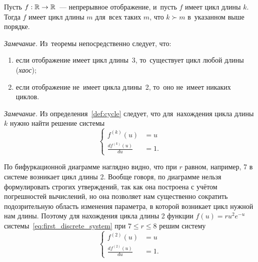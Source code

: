 \begin{theorem}[Шарковского]
        Пусть $f:\mathbb{R}\rightarrow\mathbb{R}$~--- непрерывное отображение, и~пусть $f$ имеет цикл длины $k$. Тогда $f$ имеет цикл длины $m$ для~всех таких $m$, что $k \succ m$ в~указанном выше порядке. \cite[стр.~89]{bratus10}
\end{theorem}
\textit{Замечание.} Из~теоремы непосредственно следует, что:
\begin{enumerate}
        \item если отображение имеет цикл длины~3, то~существует цикл любой длины (\textit{хаос});
        \item если отображение не~имеет цикла длины~2, то~оно не~имеет никаких циклов.
\end{enumerate}
\textit{Замечание.} Из определения~\ref{def:cycle} следует, что для~нахождения цикла длины $k$ нужно найти решение системы
$$
        \left\{
        \begin{array}{ll}
                f^{(k)}(u) &=u \\
                \frac{df^{(k)}(u)}{du} &=1.
        \end{array}
        \right.
$$

По бифуркационной диаграмме наглядно видно, что при $r$ равном, например, 7 в системе возникает цикл длины 2. Вообще говоря, по диаграмме нельзя формулировать строгих утверждений, так как она построена с учётом погрешностей вычислений, но она позволяет нам существенно сократить подозрительную область изменения параметра, в которой возникает цикл нужной нам длины. Поэтому для нахождения цикла длины 2 функции $f(u) = ru^2e^{-u}$ системы~\ref{eq:first_discrete_system} при $7 \leqslant r \leqslant 8$ решим систему 
$$
        \left\{
        \begin{array}{ll}
                f^{(2)}(u) &=u \\
                \frac{df^{(2)}(u)}{du} &=1.
        \end{array}
        \right.
$$

